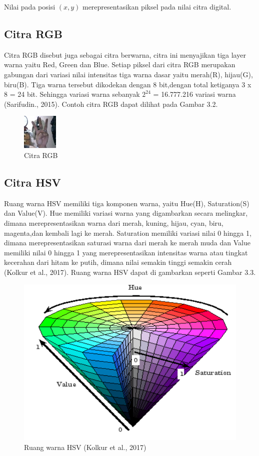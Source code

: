 Nilai pada posisi \((x,y)\) merepresentasikan piksel pada nilai citra digital.

\subsection{Citra RGB}
Citra RGB disebut juga sebagai citra berwarna, citra ini menyajikan tiga layer warna yaitu Red, Green dan Blue. Setiap piksel dari citra RGB merupakan gabungan dari variasi nilai intensitas tiga warna dasar yaitu merah(R), hijau(G), biru(B). Tiga warna tersebut dikodekan dengan 8 bit,dengan total ketiganya 3 x 8 = 24 bit. Sehingga variasi warna sebanyak $2^{24}$ = 16.777.216 variasi warna (Sarifudin., 2015). Contoh citra RGB dapat dilihat pada Gambar 3.2.
\begin{figure}[H]
	\centering
	\includegraphics[width=0.3\linewidth]{29}
	\caption{Citra RGB}
	\label{fig:29}
\end{figure}

\subsection{Citra HSV}
Ruang warna HSV memiliki tiga komponen warna, yaitu Hue(H), Saturation(S) dan Value(V).
Hue memiliki variasi warna yang digambarkan secara melingkar, dimana merepresentasikan warna dari merah, kuning, hijau, cyan, biru, magenta,dan kembali lagi ke merah.
Saturation memiliki variasi nilai 0 hingga 1, dimana merepresentasikan saturasi warna dari merah ke merah muda dan Value memiliki nilai 0 hingga 1 yang merepresentasikan intensitas warna atau tingkat kecerahan dari hitam ke putih, dimana nilai semakin tinggi semakin cerah (Kolkur et al., 2017).
Ruang warna HSV dapat di gambarkan seperti Gambar 3.3.
\begin{figure}
	\centering
	\includegraphics[width=0.5\linewidth]{hsv}
	\caption{Ruang warna HSV (Kolkur et al., 2017)}
	\label{fig:hsv}
\end{figure}

